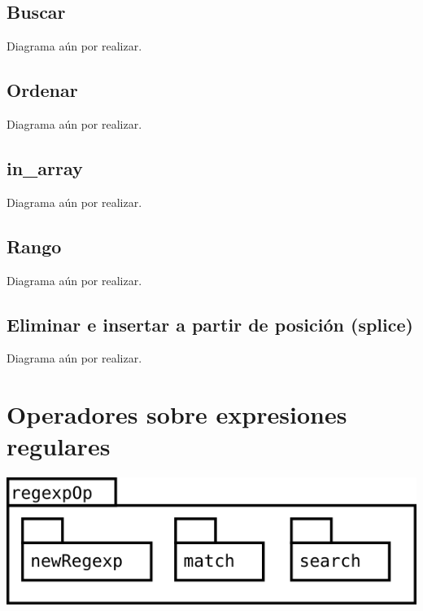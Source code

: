 \subsection {Buscar}
Diagrama aún por realizar.

\subsection {Ordenar}
Diagrama aún por realizar.

\subsection {in\_array}
Diagrama aún por realizar.

\subsection {Rango}
Diagrama aún por realizar.

\subsection {Eliminar e insertar a partir de posición (splice)}
Diagrama aún por realizar.

\pagebreak
\section {Operadores sobre expresiones regulares}
\begin{center}
\includegraphics[scale=0.4]{regexpOp-package.png} \\
\end{center}

